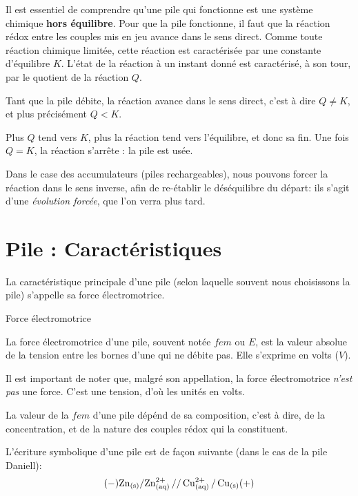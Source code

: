 \documentclass[11pt,a4paper]{article}
\begin{document}
\begin{rmrq}
Il est essentiel de comprendre qu'une pile qui fonctionne est une système chimique \textbf{hors équilibre}. Pour que la pile fonctionne, il faut que la réaction rédox entre les couples mis en jeu avance dans le sens direct. Comme toute réaction chimique limitée, cette réaction est caractérisée par une constante d'équilibre $K$. L'état de la réaction à un instant donné est caractérisé, à son tour, par le quotient de la réaction $Q$. 

Tant que la pile débite, la réaction avance dans le sens direct, c'est à dire $Q\neq K$, et plus précisément $Q<K$. 

Plus $Q$ tend vers $K$, plus la réaction tend vers l'équilibre, et donc sa fin. Une fois $Q = K$, la réaction s'arrête : la pile est usée. 

Dans le case des accumulateurs (piles rechargeables), nous pouvons forcer la réaction dans le sens inverse, afin de re-établir le déséquilibre du départ: ils s'agit d'une \textit{évolution forcée}, que l'on verra plus tard. 
\end{rmrq}

\section{Pile : Caractéristiques}

La caractéristique principale d'une pile (selon laquelle souvent nous choisissons la pile) s'appelle 
sa force électromotrice. 
\begin{defn}{Force électromotrice}

La force électromotrice d'une pile, souvent notée $fem$ ou $E$, est la valeur absolue de la tension entre les bornes d'une qui ne débite pas. Elle s'exprime en volts ($V$). 
\end{defn}

\begin{rmrq}
Il est important de noter que, malgré son appellation, la force électromotrice \textit{n'est pas} une force. C'est une tension, d'où les unités en volts. 

La valeur de la $fem$ d'une pile dépénd de sa composition, c'est à dire, de la concentration, et de la nature des couples rédox qui la constituent. 
\end{rmrq}

\begin{eg}
L'écriture symbolique d'une pile est de façon suivante (dans le cas de la pile Daniell): 
$$(-)\ce{Zn_{(s)}/Zn^2+_{(aq)} // Cu^2+_{(aq)} / Cu_{(s)}}(+) $$ 
\end{eg}
\end{document}
